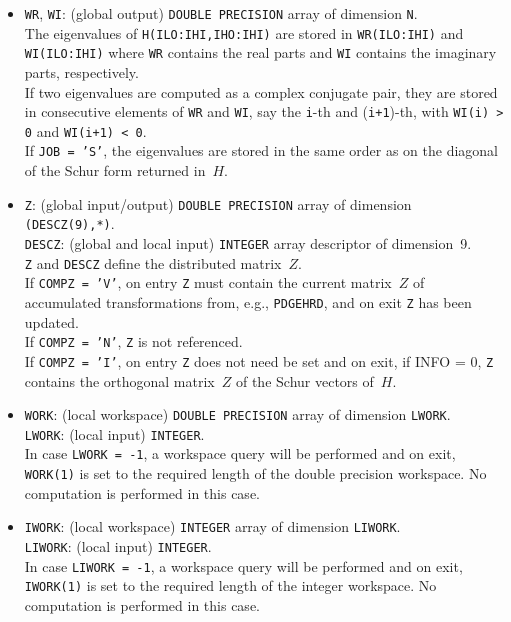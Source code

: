 \documentclass{article}
\begin{document}
\begin{itemize}
\item \texttt{WR}, \texttt{WI}: (global output) \texttt{DOUBLE PRECISION}
array of dimension \texttt{N}.\\
The eigenvalues of \texttt{H(ILO:IHI,IHO:IHI)} are stored in
\texttt{WR(ILO:IHI)} and \texttt{WI(ILO:IHI)} where \texttt{WR} contains the
real parts and \texttt{WI} contains the imaginary parts, respectively.\\
If two eigenvalues are computed as a complex conjugate pair, they are stored
in consecutive elements of \texttt{WR} and \texttt{WI}, say the \texttt{i}-th
and (\texttt{i+1})-th, with \texttt{WI(i) > 0} and \texttt{WI(i+1) < 0}.\\
If \texttt{JOB = 'S'}, the eigenvalues are stored in the same order as on the
diagonal of the Schur form returned in~$H$.

\item \texttt{Z}: (global input/output) \texttt{DOUBLE PRECISION} array of
dimension \texttt{(DESCZ(9),*)}.\\
\texttt{DESCZ}: (global and local input) \texttt{INTEGER} array descriptor of
dimension~9.\\
\texttt{Z} and \texttt{DESCZ} define the distributed matrix~$Z$.\\
If \texttt{COMPZ = 'V'}, on entry \texttt{Z} must contain the current
matrix~$Z$ of accumulated transformations from, e.g., \texttt{PDGEHRD},
and on exit \texttt{Z} has been updated.\\
If \texttt{COMPZ = 'N'}, \texttt{Z} is not referenced.\\
If \texttt{COMPZ = 'I'}, on entry \texttt{Z} does not need be set and on exit,
if INFO = 0, \texttt{Z} contains the orthogonal matrix~$Z$ of the Schur
vectors of~$H$.

\item \texttt{WORK}: (local workspace) \texttt{DOUBLE PRECISION} array of
dimension \texttt{LWORK}.\\
\texttt{LWORK}: (local input) \texttt{INTEGER}.\\
In case \texttt{LWORK = -1}, a workspace query will be performed and on exit,
\texttt{WORK(1)} is set to the required length of the double precision
workspace.
No computation is performed in this case.

\item \texttt{IWORK}: (local workspace) \texttt{INTEGER} array of dimension
\texttt{LIWORK}.\\
\texttt{LIWORK}: (local input) \texttt{INTEGER}.\\
In case \texttt{LIWORK = -1}, a workspace query will be performed and on exit,
\texttt{IWORK(1)} is set to the required length of the integer workspace.
No computation is performed in this case.


\end{itemize}
\end{document}
